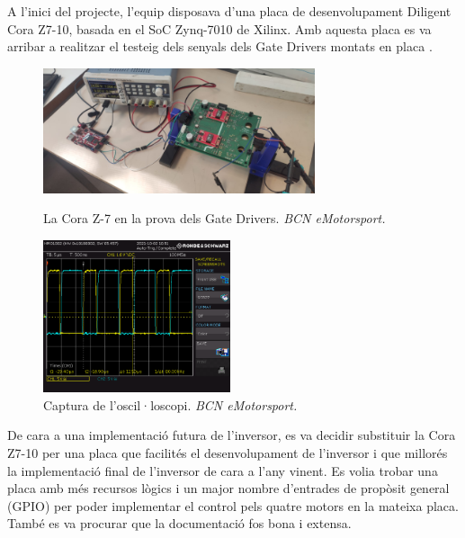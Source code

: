 { 
    A l'inici del projecte, l'equip disposava d'una placa de desenvolupament
    Diligent Cora Z7-10, basada en el \ac{SoC} Zynq-7010 de Xilinx. Amb aquesta
    placa es va arribar a realitzar el testeig dels senyals dels Gate Drivers
    montats en placa \cite{coraz7} \cite{mikel}.

    \begin{figure}[!htb]
        \centering
        \begin{minipage}[c]{8cm}
            \centering
            \captionsetup{justification=centering}
            \includegraphics[width=8cm]
                { img/4_implementacio/cora_mikel.png }
            \caption{ La Cora Z-7 en la prova dels Gate Drivers. \emph{BCN eMotorsport.} }                
        \end{minipage} \hfil
        \begin{minipage}[c]{7.5cm}
            \centering
            \captionsetup{justification=centering}
            \includegraphics[width=5.5cm]
                { img/4_implementacio/gate_drivers.png }
            \caption{ Captura de l'oscil·loscopi. \emph{BCN eMotorsport.} }                
        \end{minipage} \hfil
    \end{figure} 

    De cara a una implementació futura de l'inversor, es va decidir substituir
    la Cora Z7-10 per una placa que facilités el desenvolupament de l'inversor
    i que millorés la implementació final de l'inversor de cara a l'any vinent.
    Es volia trobar una placa amb més recursos lògics i un major nombre
    d'entrades de propòsit general (GPIO) per poder implementar el control pels
    quatre motors en la mateixa placa. També es va procurar que la
    documentació fos bona i extensa.

}
